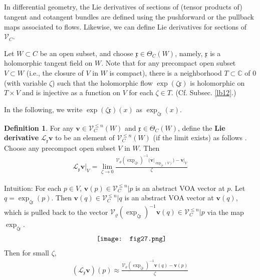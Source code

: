 \documentclass[12pt,a4paper,notitlepage]{article}
\theoremstyle{definition}
\newtheorem{df}{Definition}[section]
\theoremstyle{plain}
\newcommand{\fk}{\mathfrak}
\newcommand{\mc}{\mathcal}
\newcommand{\scr}{\mathscr}
\newcommand{\xk}{\mathfrak x}
\newcommand{\Cbb}{\mathbb C}
\newcommand{\vbf}{\mathbf v}
\numberwithin{equation}{section}
\begin{document}
\subsection{}

In differential geometry, the Lie derivatives of sections of (tensor products of) tangent and cotangent bundles are defined using the pushforward or the pullback maps associated to flows. Likewise, we can define Lie derivatives for sections of $\scr V_C$. 


Let $W\subset C$ be an open subset, and choose $\fk x\in\Theta_C(W)$, namely, $\xk$ is a holomorphic tangent field on $W$. Note that for any precompact open subset $V\subset W$ (i.e., the closure of $V$ in $W$ is compact), there is a neighborhood $T\subset\Cbb$ of $0$ (with variable $\zeta$) such that the holomorphic flow $\exp(\zeta \fk x)$ is holomorphic on $T\times V$ and is injective as a function on $V$ for each $\zeta\in T$. (Cf. Subsec. \ref{lb12}.)



In the following, we write $\exp(\zeta\xk)(x)$ as $\exp_{\zeta\xk}(x)$.

\begin{df}\label{lb129}
For any $\vbf\in\scr V_C^{\leq n}(W)$ and $\xk\in\Theta_C(W)$, define the \textbf{Lie derivative} $\mc L_\xk\vbf$  \index{L@$\mc L_\xk$, the Lie derivative} to be an element of $\scr V_C^{\leq n}(W)$ (if the limit exists) as follows . Choose any precompact open subset $V$ in $W$. Then
\begin{align}\label{eq207}
\mc L_\xk\vbf\big|_V=\lim_{\zeta\rightarrow0} \frac{\mc V_\varrho(\exp_{\zeta\xk})^{-1}\big(\vbf\big|_{\exp_{\zeta\xk}(V)}\big)-\vbf\big|_V}{\zeta}
\end{align}
\end{df}


Intuition: For each $p\in V$, $\vbf(p)\in\scr V_C^{\leq n}|p$ is an abstract VOA vector at $p$. Let $q=\exp_{\zeta\xk}(p)$. Then  $\vbf(q)\in\scr V_C^{\leq n}|q$ is an abstract VOA vector at $\vbf(q)$,  which is pulled back to the vector $\mc V_\varrho(\exp_{\zeta\xk})^{-1}\vbf(q)\in\scr V_C^{\leq n}|p$ via the map $\exp_{\zeta\xk}$.
\begin{align}\label{eq202}
\vcenter{\hbox{{
\texttt{[image: fig27.png]}}}}
\end{align}
Then for small $\zeta$,
\begin{align}
(\mc L_\xk\vbf)(p)\approx \frac{\mc V_\varrho(\exp_{\zeta\xk})^{-1}\vbf(q)-\vbf(p)}{\zeta}
\end{align}
\end{document}
